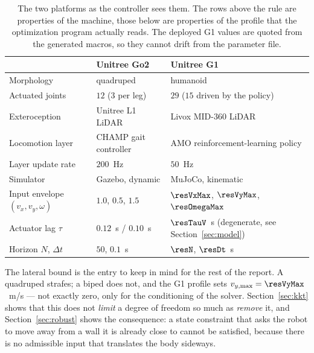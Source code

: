 \documentclass[11pt,a4paper]{article}
\begin{document}
\begin{table}[htbp]
  \centering
  \small
  \caption{The two platforms as the controller sees them. The rows above the rule are properties of the
  machine, those below are properties of the profile that the optimization program actually reads. The
  deployed G1 values are quoted from the generated macros, so they cannot drift from the parameter file.}
  \label{tab:platforms}
  \begin{tabular}{lll}
    \toprule
                                & Unitree Go2                      & Unitree G1 \\
    \midrule
    Morphology                  & quadruped                        & humanoid \\
    Actuated joints             & $12$ ($3$ per leg)               & $29$ ($15$ driven by the policy) \\
    Exteroception               & Unitree L1 LiDAR                 & Livox MID-360 LiDAR \\
    \midrule
    Locomotion layer            & CHAMP gait controller            & AMO reinforcement-learning policy \\
    Layer update rate           & $200$~Hz                         & $50$~Hz \\
    Simulator                   & Gazebo, dynamic                  & MuJoCo, kinematic \\
    \midrule
    Input envelope $(v_x,v_y,\omega)$
                                & $1.0$, $0.5$, $1.5$              & $\resVxMax$, $\resVyMax$, $\resOmegaMax$ \\
    Actuator lag $\tau$         & $0.12$~s / $0.10$~s              & $\resTauV$~s (degenerate, see
                                                                     Section~\ref{sec:model}) \\
    Horizon $N$, $\Delta t$     & $50$, $0.1$~s                    & $\resN$, $\resDt$~s \\
    \bottomrule
  \end{tabular}
\end{table}

The lateral bound is the entry to keep in mind for the rest of the report. A quadruped strafes; a biped does
not, and the G1 profile sets $v_{y,\max}=\resVyMax$~m/s --- not exactly zero, only for the conditioning of
the solver. Section~\ref{sec:kkt} shows that this does not \emph{limit} a degree of freedom so much as
\emph{remove} it, and Section~\ref{sec:robust} shows the consequence: a state constraint that asks the robot
to move away from a wall it is already close to cannot be satisfied, because there is no admissible input
that translates the body sideways.
\end{document}
